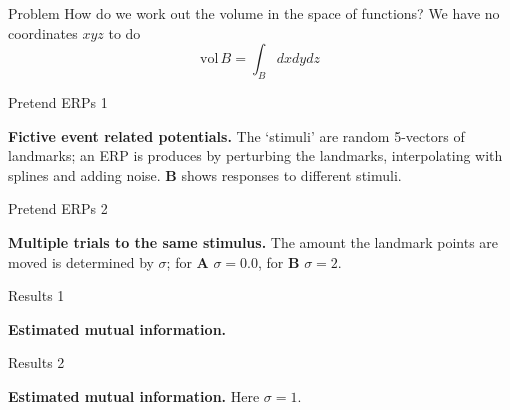 \documentclass{beamer}
\begin{document}
\begin{frame}{Problem}
\color{black}
How do we work out the volume in the space of functions? We have no coordinates $xyz$ to do
\color{dark}
$$\mbox{vol}\,B=\int_B dxdydz$$
\end{frame}


\begin{frame}{Pretend ERPs 1}
\color{reddish}
\begin{center}

\end{center}
\color{black} \textbf{Fictive event related potentials.} The
\lq{}stimuli\rq{} are random 5-vectors of landmarks; an ERP is
produces by perturbing the landmarks, interpolating with splines and
adding noise. \textbf{B} shows responses to different stimuli.
\color{black}
\end{frame}


\begin{frame}{Pretend ERPs 2}
\color{reddish}
\begin{center}

\end{center}
\color{black} \textbf{Multiple trials to the same stimulus.} The
amount the landmark points are moved is determined by $\sigma$; for
\textbf{A} $\sigma=0.0$, for \textbf{B} $\sigma=2$.  \color{black}
\end{frame}



\begin{frame}{Results 1}
\color{reddish}
\begin{center}

\color{black} \textbf{Estimated mutual information.} \color{black}
\end{center}
\end{frame}


\begin{frame}{Results 2}
\color{reddish}
\begin{center}
  
\color{black} \textbf{Estimated mutual information.} Here $\sigma=1$. \color{black}
\end{center}
\end{frame}


\end{document}

